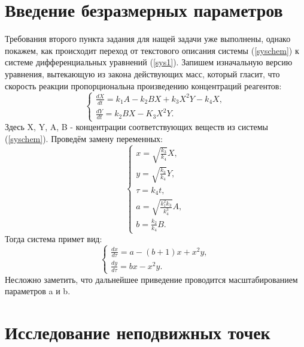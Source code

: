 \documentclass[12pt]{article}
\begin{document}
\section{Введение безразмерных параметров}
Требования второго пункта задания для нащей задачи уже выполнены, однако покажем, как происходит переход от текстового описания системы (\ref{syschem}) к системе дифференциальных уравнений (\ref{sys1}). Запишем изначальную версию уравнения, вытекающую из закона действующих масс, который гласит, что скорость реакции пропорциональна произведению концентраций реагентов:
\begin{equation}
    \begin{cases}
        \frac{dX}{dt} = k_1A - k_2BX + k_3X^2Y - k_4X,\\
        \frac{dY}{dt} = k_2BX - K_3X^2Y.
    \end{cases}
\end{equation}
Здесь X, Y, A, B - концентрации соответствующих веществ из системы (\ref{syschem}). Проведём замену переменных:
\begin{equation}
    \begin{cases}
        x = \sqrt{\frac{k_3}{k_4}}X,\\
        y = \sqrt{\frac{k_3}{k_4}}Y,\\
        \tau = k_4t,\\
        a = \sqrt{\frac{k_1^2k_3}{k_4^3}}A,\\
        b = \frac{k_2}{k_4}B.
    \end{cases}
\end{equation}
Тогда система примет вид:
\begin{equation} \label{syschemcommon}
    \begin{cases}
        \frac{dx}{d\tau} = a - (b + 1)x + x^2y,\\
        \frac{dy}{d\tau} = bx - x^2y.
    \end{cases}
\end{equation}
Несложно заметить, что дальнейшее приведение проводится масштабированием параметров a и b.

\newpage
\section{Исследование неподвижных точек}
\end{document}
